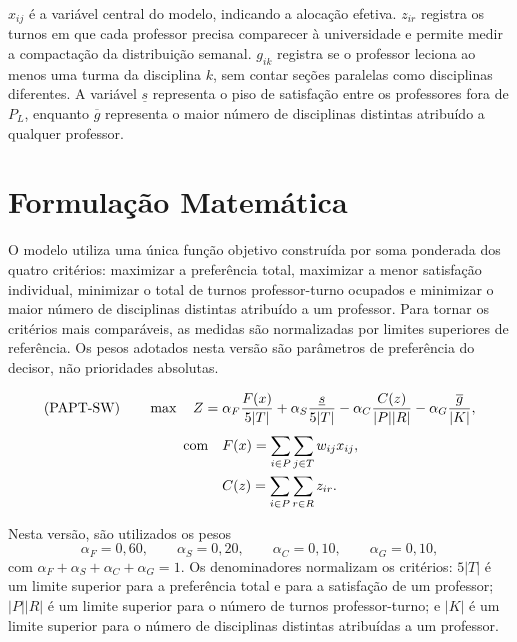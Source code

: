 \documentclass[11pt,a4paper]{article}
\begin{document}
$x_{ij}$ é a variável central do modelo, indicando a alocação efetiva. $z_{ir}$ registra os turnos em que cada professor precisa comparecer à universidade e permite medir a compactação da distribuição semanal. $g_{ik}$ registra se o professor leciona ao menos uma turma da disciplina $k$, sem contar seções paralelas como disciplinas diferentes. A variável $\underline{s}$ representa o piso de satisfação entre os professores fora de $P_L$, enquanto $\overline{g}$ representa o maior número de disciplinas distintas atribuído a qualquer professor.


\section{Formulação Matemática}

O modelo utiliza uma única função objetivo construída por soma ponderada dos quatro critérios: maximizar a preferência total, maximizar a menor satisfação individual, minimizar o total de turnos professor-turno ocupados e minimizar o maior número de disciplinas distintas atribuído a um professor. Para tornar os critérios mais comparáveis, as medidas são normalizadas por limites superiores de referência. Os pesos adotados nesta versão são parâmetros de preferência do decisor, não prioridades absolutas.

\begin{align}
\text{(PAPT-SW)} \qquad \max \quad
Z ={}& \alpha_F\frac{F(x)}{5|T|}
+ \alpha_S\frac{\underline{s}}{5|T|}
- \alpha_C\frac{C(z)}{|P||R|}
- \alpha_G\frac{\overline{g}}{|K|}, \label{eq:objetivo_ponderado}\\[3pt]
\text{com} \quad
& F(x)=\sum_{i\in P}\sum_{j\in T}w_{ij}x_{ij}, \notag\\
& C(z)=\sum_{i\in P}\sum_{r\in R}z_{ir}. \notag
\end{align}

Nesta versão, são utilizados os pesos
\[
\alpha_F=0{,}60,\qquad \alpha_S=0{,}20,\qquad
\alpha_C=0{,}10,\qquad \alpha_G=0{,}10,
\]
com $\alpha_F+\alpha_S+\alpha_C+\alpha_G=1$. Os denominadores normalizam os critérios: $5|T|$ é um limite superior para a preferência total e para a satisfação de um professor; $|P||R|$ é um limite superior para o número de turnos professor-turno; e $|K|$ é um limite superior para o número de disciplinas distintas atribuídas a um professor.
\end{document}
